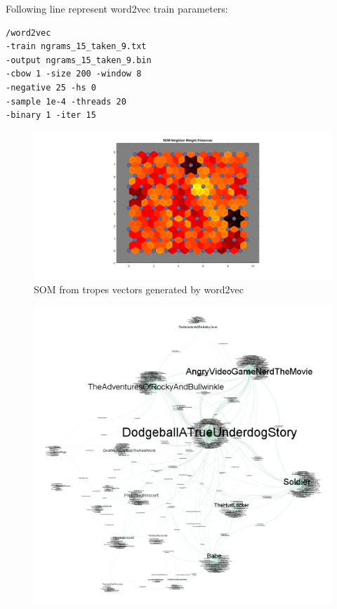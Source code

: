 \documentclass[letterpaper]{article}
\begin{document}
    Following line represent word2vec train parameters:\\
\begin{verbatim}
/word2vec 
-train ngrams_15_taken_9.txt 
-output ngrams_15_taken_9.bin 
-cbow 1 -size 200 -window 8 
-negative 25 -hs 0 
-sample 1e-4 -threads 20 
-binary 1 -iter 15
\end{verbatim}

	\begin{figure}
	\centering
		\includegraphics[width=1.25\linewidth]{../images/som_matlab_tropes_15_9}
			\caption{SOM from tropes vectors generated by word2vec}
			\label{fig:sommatlabtropes159}
		\end{figure}
	
	\begin{figure}
		\centering
		\includegraphics[width=0.9\linewidth]{../data/gephi/pairs_films-trope_1k_v3}
		\caption{}
		\label{fig:pairsfilms-trope1kv3}
	\end{figure}
	
\end{document}
